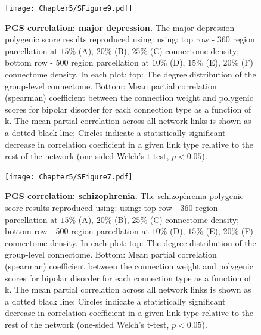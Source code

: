 \begin{figure}[h!]
\begin{center}
\texttt{[image: Chapter5/SFigure9.pdf]}%
\end{center}
\caption{\textbf{PGS correlation: major depression.} 
The major depression polygenic score results reproduced using: using: top row - 360 region parcellation at $15\%$ (A), $20\%$ (B), $25\%$ (C) connectome density; bottom row - 500 region parcellation at $10\%$ (D), $15\%$ (E), $20\%$ (F) connectome density. In each plot: top: The degree distribution of the group-level connectome. Bottom: Mean partial correlation (spearman) coefficient between the connection weight and polygenic scores for bipolar disorder for each connection type as a function of k. The mean partial correlation across all network links is shown as a dotted black line; Circles indicate a statistically significant decrease in correlation coefficient in a given link type relative to the rest of the network (one-sided Welch's t-test, $p < 0.05$).}
\label{fig:Ch5SFig9}
\end{figure}
 
\begin{figure}[h!]
\begin{center}
\texttt{[image: Chapter5/SFigure7.pdf]}%
\end{center}
\caption{\textbf{PGS correlation: schizophrenia.} 
The schizophrenia polygenic score results reproduced using: using: top row - 360 region parcellation at $15\%$ (A), $20\%$ (B), $25\%$ (C) connectome density; bottom row - 500 region parcellation at $10\%$ (D), $15\%$ (E), $20\%$ (F) connectome density. In each plot: top: The degree distribution of the group-level connectome. Bottom: Mean partial correlation (spearman) coefficient between the connection weight and polygenic scores for bipolar disorder for each connection type as a function of k. The mean partial correlation across all network links is shown as a dotted black line; Circles indicate a statistically significant decrease in correlation coefficient in a given link type relative to the rest of the network (one-sided Welch's t-test, $p < 0.05$).}
\label{fig:Ch5SFig7}
\end{figure}


